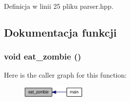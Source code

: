 Definicja w linii 25 pliku parser.hpp.

\subsection{Dokumentacja funkcji}
\hypertarget{a00015_6c724feff242ad0cd599cdd458f73199}{
\subsubsection[{eat\_\-zombie}]{\setlength{\rightskip}{0pt plus 5cm}void eat\_\-zombie ()}}
\label{dd/d1b/a00015_6c724feff242ad0cd599cdd458f73199}




Here is the caller graph for this function:\nopagebreak
\begin{figure}[H]
\begin{center}
\leavevmode
\includegraphics[width=92pt]{dd/d1b/a00015_6c724feff242ad0cd599cdd458f73199_icgraph}
\end{center}
\end{figure}
